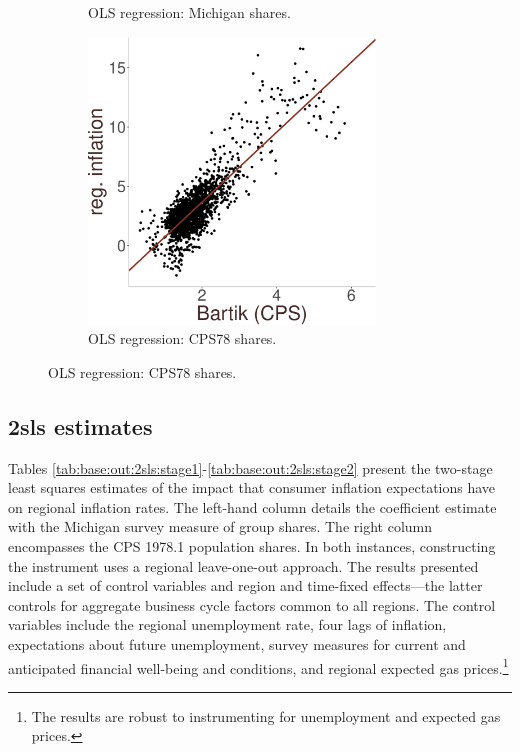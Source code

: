 \documentclass[12pt]{article}
\begin{document}
\begin{figure}
\begin{subfigure}[t]{0.475\textwidth}
\caption{OLS regression: Michigan shares.}\label{subfig:redform:stage2:michigan}
\end{subfigure}
\begin{subfigure}[t]{0.475\textwidth}
\centering
\includegraphics[width =3in, height =3in]{figs/redform_cps}
\caption{OLS regression: CPS78 shares.}\label{subfig:redform:stage2:cps}
\end{subfigure}
\end{figure}


\subsection{2sls estimates}



Tables \ref{tab:base:out:2sls:stage1}-\ref{tab:base:out:2sls:stage2} present the two-stage least squares estimates of the impact that consumer inflation expectations have on regional inflation rates. The left-hand column details the coefficient estimate with the Michigan survey measure of group shares. The right column encompasses the CPS 1978.1 population shares. In both instances, constructing the instrument uses a regional leave-one-out approach. The results presented include a set of control variables and region and time-fixed effects—the latter controls for aggregate business cycle factors common to all regions. The control variables include the regional unemployment rate, four lags of inflation, expectations about future unemployment, survey measures for current and anticipated financial well-being and conditions, and regional expected gas prices.\footnote{The results are robust to instrumenting for unemployment and expected gas prices.}



\end{document}
